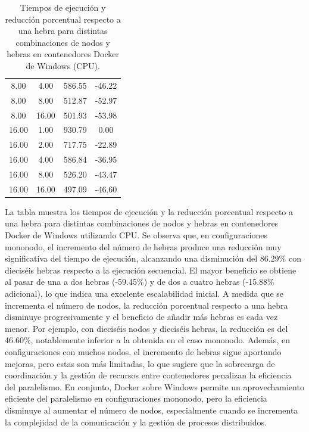 \begin{table}[ht]
\begin{tabular}{|c|c|c|c|}
        8.00           & 4.00            & 586.55              & -46.22                         \\
        8.00           & 8.00            & 512.87              & -52.97                         \\
        8.00           & 16.00           & 501.93              & -53.98                         \\
        16.00          & 1.00            & 930.79              & 0.00                           \\
        16.00          & 2.00            & 717.75              & -22.89                         \\
        16.00          & 4.00            & 586.84              & -36.95                         \\
        16.00          & 8.00            & 526.20              & -43.47                         \\
        16.00          & 16.00           & 497.09              & -46.60                         \\
        \hline
    \end{tabular}
    \caption{Tiempos de ejecución y reducción porcentual respecto a una hebra para distintas combinaciones de nodos y hebras en contenedores Docker de Windows (CPU).}
    \label{tab:thread_sweep_windows_docker_time}
\end{table}

La tabla muestra los tiempos de ejecución y la reducción porcentual respecto a una hebra para distintas combinaciones de nodos y hebras en contenedores Docker de Windows utilizando CPU. Se observa que, en configuraciones mononodo, el incremento del número de hebras produce una reducción muy significativa del tiempo de ejecución, alcanzando una disminución del 86.29\% con dieciséis hebras respecto a la ejecución secuencial. El mayor beneficio se obtiene al pasar de una a dos hebras (-59.45\%) y de dos a cuatro hebras (-15.88\% adicional), lo que indica una excelente escalabilidad inicial. A medida que se incrementa el número de nodos, la reducción porcentual respecto a una hebra disminuye progresivamente y el beneficio de añadir más hebras es cada vez menor. Por ejemplo, con dieciséis nodos y dieciséis hebras, la reducción es del 46.60\%, notablemente inferior a la obtenida en el caso mononodo. Además, en configuraciones con muchos nodos, el incremento de hebras sigue aportando mejoras, pero estas son más limitadas, lo que sugiere que la sobrecarga de coordinación y la gestión de recursos entre contenedores penalizan la eficiencia del paralelismo. En conjunto, Docker sobre Windows permite un aprovechamiento eficiente del paralelismo en configuraciones mononodo, pero la eficiencia disminuye al aumentar el número de nodos, especialmente cuando se incrementa la complejidad de la comunicación y la gestión de procesos distribuidos.

